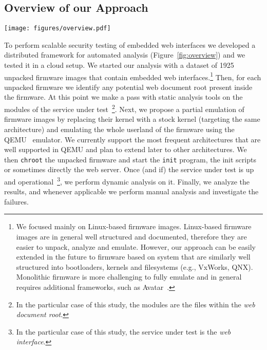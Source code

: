 \documentclass[conference]{./templates/ndss/IEEEtran}
\newcounter{t0d0_counter}
\newcounter{pr00f_counter}
\newcommand{\countfirmwarewebTP}{1925}
\begin{document}
\subsection{Overview of our Approach}
\label{sec:overview}

\begin{figure*}
  \center
  \texttt{[image: figures/overview.pdf]}
  \caption{Overview of the analysis framework.}
  \label{fig:overview}
\end{figure*}

To perform scalable security testing of embedded web interfaces we developed a
distributed framework for automated analysis (Figure~\ref{fig:overview}) and 
we tested it in a cloud setup.  We started
our analysis with a dataset of \countfirmwarewebTP{} 
unpacked firmware images
that contain embedded web interfaces.\footnote{We focused mainly on Linux-based 
firmware images. Linux-based firmware images 
are in general well structured and documented, therefore they are easier to 
unpack, analyze and emulate. However, our approach can be easily extended 
in the future to firmware based on system that are similarly well structured 
into bootloaders, kernels and filesystems (e.g., VxWorks, QNX). 
Monolithic firmware is more challenging to fully emulate and in general 
requires additional frameworks, such as Avatar~\cite{zaddach:ndss14}. } 
Then, for each unpacked firmware we identify any potential web
document root present inside the firmware.  At this point we make a
pass with static analysis tools on the modules of the service under test~\footnote{In the particular case of this study, the modules are the files within the \emph{web document root}.}.
Next, we propose a partial emulation of firmware images by replacing
their kernel with a stock kernel (targeting the same architecture) and
emulating the whole userland of the firmware using the QEMU~\cite{qemu}
emulator. We currently support the most frequent architectures that are well supported in QEMU and plan to extend later to other architectures.
We then \texttt{chroot} the unpacked
firmware and start the \texttt{init} program, the init scripts or
sometimes directly the web server. Once (and if) the service under test is
up and operational~\footnote{In the particular case of this study, the service under test is the \emph{web interface}.}, 
we perform dynamic analysis on it. 
Finally, we analyze the results, and whenever applicable we perform manual 
analysis and investigate the failures. 
\end{document}
